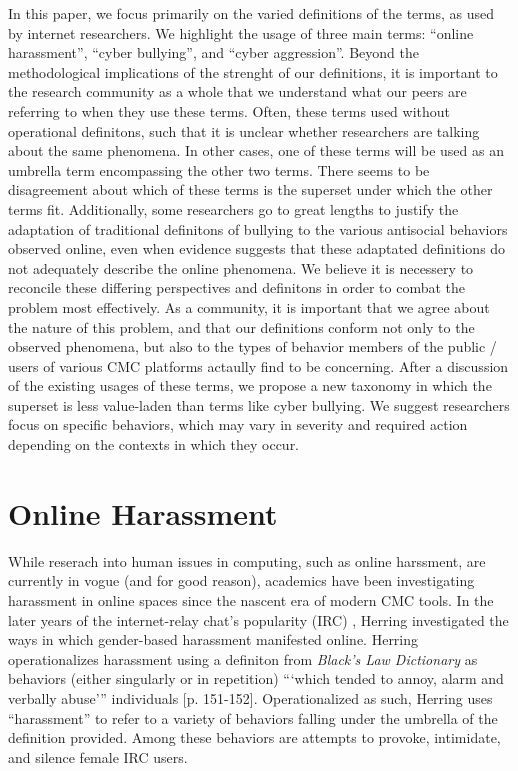\documentclass{sigchi}
\begin{document}
In this paper, we focus primarily on the varied definitions of the terms, as used by internet researchers.  We highlight the usage of three main terms: ``online harassment'', ``cyber bullying'', and ``cyber aggression''.  Beyond the methodological implications of the strenght of our definitions, it is important to the research community as a whole that we understand what our peers are referring to when they use these terms.  Often, these terms used without operational definitons, such that it is unclear whether researchers are talking about the same phenomena.  In other cases, one of these terms will be used as an umbrella term encompassing the other two terms.  There seems to be disagreement about which of these terms is the superset under which the other terms fit.  Additionally, some researchers go to great lengths to justify the adaptation of traditional definitons of bullying to the various antisocial behaviors observed online, even when evidence suggests that these adaptated definitions do not adequately describe the online phenomena.  We believe it is necessery to reconcile these differing perspectives and definitons in order to combat the problem most effectively.  As a community, it is important that we agree about the nature of this problem, and that our definitions conform not only to the observed phenomena, but also to the types of behavior members of the public / users of various CMC platforms actaully find to be concerning.  After a discussion of the existing usages of these terms, we propose a new taxonomy in which the superset is less value-laden than terms like cyber bullying.  We suggest researchers focus on specific behaviors, which may vary in severity and required action depending on the contexts in which they occur.

\section{Online Harassment}

While reserach into human issues in computing, such as online harssment, are currently in vogue (and for good reason), academics have been investigating harassment in online spaces since the nascent era of modern CMC tools.  In the later years of the internet-relay chat's popularity (IRC) , Herring \cite{Herring1999Rhetorical} investigated the ways in which gender-based harassment manifested online.  Herring operationalizes harassment using a definiton from \textit{Black's Law Dictionary} as behaviors (either singularly or in repetition) ```which tended to annoy, alarm and verbally abuse''' individuals [p. 151-152].  Operationalized as such, Herring uses ``harassment'' to refer to a variety of behaviors falling under the umbrella of the definition provided.  Among these behaviors are attempts to provoke, intimidate, and silence female IRC users.  
\end{document}
